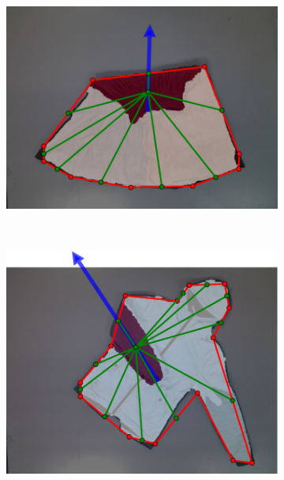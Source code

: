 \begin{figure}[htbp]
	\centering
	\begin{subfigure}[l]{\bigtablewidth}
	    \centering
    	\includegraphics[width=\textwidth]
    	{figures/results/skirt3-pnp.pdf}
	\end{subfigure}
	~
	\begin{subfigure}[r]{\bigtablewidth}
	    \centering
    	\includegraphics[width=\textwidth]
    	{figures/results/jacket1-pnp.pdf}
	\end{subfigure}
	~
    \begin{subfigure}[l]{\bigtablewidth}

\end{subfigure}
\end{figure}
